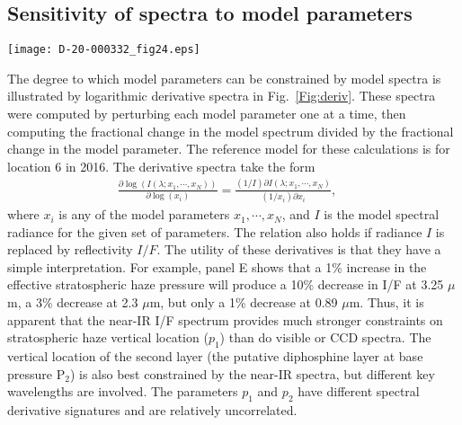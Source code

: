 \documentclass[article,11pt]{emulateapj}
\def\mumx{$\mu$m}
\begin{document}
\subsection{Sensitivity of spectra to model parameters}


\begin{figure*}[!b]
\hspace{-0.2in}
\texttt{[image: D-20-000332\_fig24.eps]}\\%
\caption{Logarithmic derivative spectra for pressures (A-D), optical depths (E-H),
particle radii (I-L), minor gas parameters (M-O), and chromophore refractive
index parameters (P-R). See Table\ \ref{Tbl:paramlist} and Eqns. 2-4 for definitions of variable names.}
\label{Fig:deriv}
\end{figure*}

The degree to which model parameters can be constrained by model spectra
is illustrated by logarithmic derivative spectra in Fig.\ \ref{Fig:deriv}.
These spectra were computed by perturbing each model parameter one at a time,
then computing the fractional change in the model spectrum divided by
the fractional change in the model parameter. The reference model for
these calculations is for location 6 in 2016. The derivative spectra  
take the form 
\begin{eqnarray} \frac{\partial \log (I(\lambda; x_1, \cdots,
    x_N))}{\partial \log (x_i)} = \frac{(1/I)\partial I(\lambda; x_1,
    \cdots, x_N)}{(1/x_i)\partial x_i}, \quad \label{Eq:lnder}
\end{eqnarray}
where $x_i$ is any of the model parameters $x_1, \cdots, x_N$, and $I$ is the
model spectral radiance for the given set of parameters.  The relation also holds
if radiance $I$ is replaced by reflectivity $I/F$.
The utility of these derivatives is that they have a simple interpretation.
For example, panel E shows that a 1\% increase in the effective stratospheric haze
pressure will produce a 10\% decrease in I/F at 3.25 \mumx, a 3\% decrease
at 2.3 \mumx, but only a 1\% decrease at 0.89 \mumx.  Thus, it is apparent that
the near-IR I/F spectrum provides much stronger constraints on stratospheric
haze vertical location ($p_1$) than do visible or CCD spectra. The vertical location
of the second layer (the putative diphosphine layer at base pressure P$_2$) is also best constrained
by the near-IR spectra, but different key wavelengths are involved. The
parameters $p_1$ and $p_2$ have different spectral derivative signatures and are relatively
uncorrelated.
  
\end{document}
